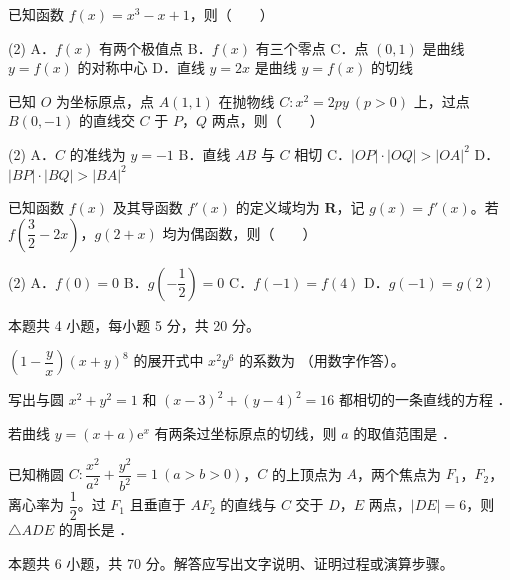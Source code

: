 已知函数 $f(x)=x^{3}-x+1$，则（　　）

\begin{gkopts}(2)
\task A．$f(x)$ 有两个极值点
\task B．$f(x)$ 有三个零点
\task C．点 $(0,1)$ 是曲线 $y=f(x)$ 的对称中心
\task D．直线 $y=2x$ 是曲线 $y=f(x)$ 的切线
\end{gkopts}

已知 $O$ 为坐标原点，点 $A(1,1)$ 在抛物线 $C:x^{2}=2py\ (p>0)$ 上，过点 $B(0,-1)$ 的直线交 $C$ 于 $P$，$Q$ 两点，则（　　）

\begin{gkopts}(2)
\task A．$C$ 的准线为 $y=-1$
\task B．直线 $AB$ 与 $C$ 相切
\task C．$|OP|\cdot|OQ|>|OA|^{2}$
\task D．$|BP|\cdot|BQ|>|BA|^{2}$
\end{gkopts}

已知函数 $f(x)$ 及其导函数 $f'(x)$ 的定义域均为 $\mathbf R$，记 $g(x)=f'(x)$。若 $f\left(\dfrac32-2x\right)$，$g(2+x)$ 均为偶函数，则（　　）

\begin{gkopts}(2)
\task A．$f(0)=0$
\task B．$g\left(-\dfrac12\right)=0$
\task C．$f(-1)=f(4)$
\task D．$g(-1)=g(2)$
\end{gkopts}

\par\medskip


\begin{gktip}
本题共 4 小题，每小题 5 分，共 20 分。
\end{gktip}

$\left(1-\dfrac yx\right)(x+y)^{8}$ 的展开式中 $x^{2}y^{6}$ 的系数为 \gkblank{}（用数字作答）。

写出与圆 $x^{2}+y^{2}=1$ 和 $(x-3)^{2}+(y-4)^{2}=16$ 都相切的一条直线的方程 \gkblank{}．

若曲线 $y=(x+a)\mathrm e^{x}$ 有两条过坐标原点的切线，则 $a$ 的取值范围是 \gkblank{}．

已知椭圆 $C:\dfrac{x^{2}}{a^{2}}+\dfrac{y^{2}}{b^{2}}=1\ (a>b>0)$，$C$ 的上顶点为 $A$，两个焦点为 $F_1$，$F_2$，离心率为 $\dfrac12$。过 $F_1$ 且垂直于 $AF_2$ 的直线与 $C$ 交于 $D$，$E$ 两点，$|DE|=6$，则 $\triangle ADE$ 的周长是 \gkblank{}．

\par\medskip


\begin{gktip}
本题共 6 小题，共 70 分。解答应写出文字说明、证明过程或演算步骤。
\end{gktip}

